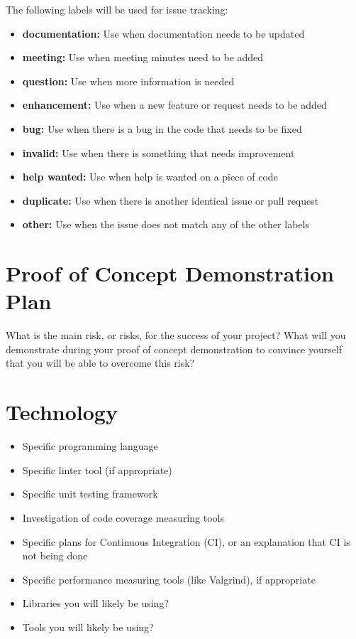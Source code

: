 \documentclass{article}
\begin{document}
The following labels will be used for issue tracking:
\begin{itemize}
    \item \textbf{documentation:} Use when documentation needs to be updated
    \item \textbf{meeting:} Use when meeting minutes need to be added
    \item \textbf{question:} Use when more information is needed
    \item \textbf{enhancement:} Use when a new feature or request needs to be added
    \item \textbf{bug:} Use when there is a bug in the code that needs to be fixed
    \item \textbf{invalid:} Use when there is something that needs improvement
    \item \textbf{help wanted:} Use when help is wanted on a piece of code
    \item \textbf{duplicate:} Use when there is another identical issue or pull request
    \item \textbf{other:} Use when the issue does not match any of the other labels
\end{itemize}

\section{Proof of Concept Demonstration Plan}

What is the main risk, or risks, for the success of your project?  What will you
demonstrate during your proof of concept demonstration to convince yourself that
you will be able to overcome this risk?

\section{Technology}

\begin{itemize}
\item Specific programming language
\item Specific linter tool (if appropriate)
\item Specific unit testing framework
\item Investigation of code coverage measuring tools
\item Specific plans for Continuous Integration (CI), or an explanation that CI
  is not being done
\item Specific performance measuring tools (like Valgrind), if
  appropriate
\item Libraries you will likely be using?
\item Tools you will likely be using?
\end{itemize}
\end{document}
